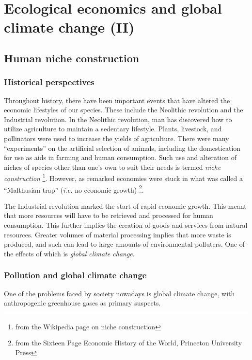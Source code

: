 \chapter{Ecological economics and global climate change (II)}

\lipsum[34]



\section{Human niche construction}
\subsection{Historical perspectives}
Throughout history, there have been important events that have altered the economic lifestyles of our species.
These include the Neolithic revolution and the Industrial revolution.
In the Neolithic revolution, man has discovered how to utilize agriculture to maintain a sedentary lifestyle.
Plants, livestock, and pollinators were used to increase the yields of agriculture.
There were many ``experiments'' on the artificial selection of animals, including the domestication for use as aids in farming and human consumption.
Such use and alteration of niches of species other than one's own to suit their needs is termed \emph{niche construction}
\footnote{from the Wikipedia page on niche construction}.
However, as remarked economies were stuck in what was called a ``Malthusian trap'' (\textit{i.e.} no economic growth)
\footnote{from the Sixteen Page Economic History of the World, Princeton University Press}.

The Industrial revolution marked the start of rapid economic growth.
This meant that more resources will have to be retrieved and processed for human consumption.
This further implies the creation of goods and services from natural resources.
Greater volumes of material processing implies that more waste is produced, and such can lead to large amounts of environmental polluters.
One of the effects of which is \emph{global climate change}.

\subsection{Pollution and global climate change}
One of the problems faced by society nowadays is global climate change, with anthropogenic greenhouse gases as primary suspects.

